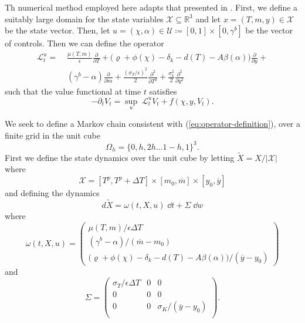 \documentclass[../../main.tex]{subfiles}
\begin{document}
Th numerical method employed here adapts that presented in \citep{kushner_numerical_2001}. First, we define a suitably large domain for the state variables $\mathcal{X} \subseteq \mathbb{R}^3$ and let $x = (T, m, y) \in \mathcal{X}$ be the state vector. Then, let $u = (\chi, \alpha) \in \mathcal{U} \coloneqq [0, 1] \times [0, \gamma^b]$ be the vector of controls. Then we can define the operator \begin{equation}
    \begin{split}
        \mathcal{L}_t^u = \; &\frac{\mu(T, m)}{\epsilon} \frac{\partial}{\partial T} + \big(\varrho + \phi(\chi) - \delta_k - d(T) - A \beta(\alpha) \big) \frac{\partial}{\partial y} + \\ 
        &(\gamma^b - \alpha)\frac{\partial}{\partial m} + \frac{(\sigma_T / \epsilon)^2}{2} \frac{\partial^2}{\partial T^2} + \frac{\sigma^2_k}{2} \frac{\partial^2}{\partial y^2} 
    \end{split}
\end{equation} such that the value functional at time $t$ satisfies \begin{equation} \label{eq:operator-definition}
    -\partial_t V_t =  \sup_{u} \; \mathcal{L}_t^u V_t + f(\chi, y, V_t).
\end{equation}

We seek to define a Markov chain consistent with (\ref{eq:operator-definition}), over a finite grid in the unit cube \begin{equation}\Omega_h = \{0, h, 2h \ldots 1 - h, 1\}^3.\end{equation} First we define the state dynamics over the unit cube by letting $\tilde{X} = X / \lvert\mathcal{X}\rvert$ where \begin{equation}
    \mathcal{X} = [T^p, T^p + \Delta T] \times [m_0, \overline{m}] \times [y_0, \overline{y}]
\end{equation} and defining the dynamics \begin{equation}
    d \tilde{X} = \omega(t, X, u) \; \dd{t} + \Sigma \; \dd{w}
\end{equation} where \begin{equation}
    \omega(t, X, u) = \begin{pmatrix}
        \mu(T, m) / \epsilon \Delta T \\
        (\gamma^{b} - \alpha) / (\overline{m} - m_0) \\
        \big(\varrho + \phi(\chi) - \delta_k - d(T) - A \beta(\alpha) \big) / (\overline{y} - y_0)
    \end{pmatrix} 
\end{equation} and \begin{equation}
    \Sigma = \begin{pmatrix}
        \sigma_T / \epsilon \Delta T  & 0 & 0 \\
        0 & 0 & 0 \\
        0 & 0 & \sigma_K / (\overline{y} - y_0)\\
    \end{pmatrix}.
\end{equation}
\end{document}

